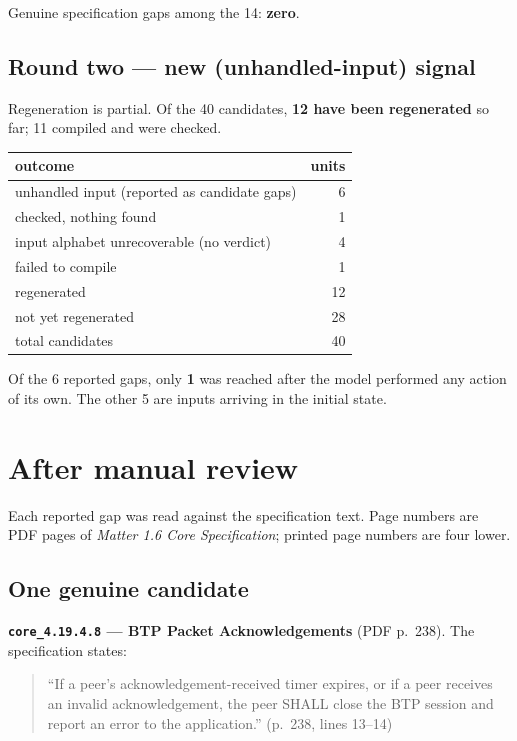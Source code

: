 \documentclass[11pt,a4paper]{article}
\begin{document}
\noindent
Genuine specification gaps among the 14: \textbf{zero}.

\subsection{Round two --- new (unhandled-input) signal}

Regeneration is partial. Of the 40 candidates, \textbf{12 have been regenerated} so
far; 11 compiled and were checked.

\begin{center}
\begin{tabular}{lr}
\toprule
outcome & units \\
\midrule
unhandled input (reported as candidate gaps) &  6 \\
checked, nothing found                       &  1 \\
input alphabet unrecoverable (no verdict)    &  4 \\
failed to compile                            &  1 \\
\midrule
regenerated                                  & 12 \\
not yet regenerated                          & 28 \\
\midrule
total candidates                             & 40 \\
\bottomrule
\end{tabular}
\end{center}

\noindent
Of the 6 reported gaps, only \textbf{1} was reached after the model performed any
action of its own. The other 5 are inputs arriving in the initial state.

\section{After manual review}

Each reported gap was read against the specification text. Page numbers are PDF
pages of \emph{Matter 1.6 Core Specification}; printed page numbers are four lower.

\subsection{One genuine candidate}

\textbf{\texttt{core\_4.19.4.8} --- BTP Packet Acknowledgements} (PDF p.~238).
The specification states:

\begin{quote}
``If a peer's acknowledgement-received timer expires, or if a peer receives an invalid
acknowledgement, the peer SHALL close the BTP session and report an error to the
application.'' \hfill (p.~238, lines 13--14)
\end{quote}
\end{document}
